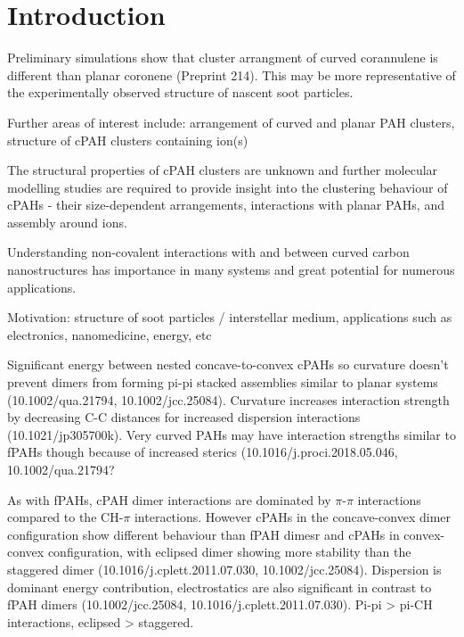 \newcommand{\curPAHAP}{curPAHIP\xspace} 
%
\section{Introduction}
\label{sec:Introduction}
% 


Preliminary simulations show that cluster arrangment of curved corannulene is different than planar coronene (Preprint 214). This may be more representative of the experimentally observed structure of nascent soot particles.

Further areas of interest include: arrangement of curved and planar PAH clusters, structure of cPAH clusters containing ion(s)

The structural properties of cPAH clusters are unknown and further molecular modelling studies are required to provide insight into the clustering behaviour of cPAHs - their size-dependent arrangements, interactions with planar PAHs, and assembly around ions.

Understanding non-covalent interactions with and between curved carbon nanostructures has importance in many systems and great potential for numerous applications.

Motivation: structure of soot particles / interstellar medium, applications such as electronics, nanomedicine, energy, etc



Significant energy between nested concave-to-convex cPAHs so curvature doesn't prevent dimers from forming pi-pi stacked assemblies similar to planar systems (10.1002/qua.21794, 10.1002/jcc.25084). Curvature increases interaction strength by decreasing C-C distances for increased dispersion interactions (10.1021/jp305700k). Very curved PAHs may have interaction strengths similar to fPAHs though because of increased sterics (10.1016/j.proci.2018.05.046, 10.1002/qua.21794?

As with fPAHs, cPAH dimer interactions are dominated by $\pi$-$\pi$ interactions compared to the CH-$\pi$ interactions. However cPAHs in the concave-convex dimer configuration show different behaviour than fPAH dimesr and cPAHs in convex-convex configuration, with eclipsed dimer showing more stability than the staggered dimer (10.1016/j.cplett.2011.07.030, 10.1002/jcc.25084).
Dispersion is dominant energy contribution, electrostatics are also significant in contrast to fPAH dimers (10.1002/jcc.25084, 10.1016/j.cplett.2011.07.030). Pi-pi > pi-CH interactions, eclipsed > staggered.

